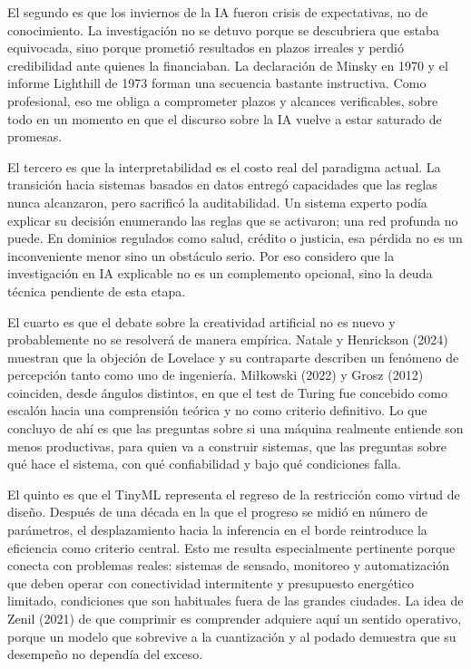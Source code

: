 \documentclass[12pt,letterpaper,oneside]{article}
\begin{document}
El segundo es que los inviernos de la IA fueron crisis de expectativas, no de conocimiento. La investigación no se detuvo porque se descubriera que estaba equivocada, sino porque prometió resultados en plazos irreales y perdió credibilidad ante quienes la financiaban. La declaración de Minsky en 1970 y el informe Lighthill de 1973 forman una secuencia bastante instructiva. Como profesional, eso me obliga a comprometer plazos y alcances verificables, sobre todo en un momento en que el discurso sobre la IA vuelve a estar saturado de promesas.

El tercero es que la interpretabilidad es el costo real del paradigma actual. La transición hacia sistemas basados en datos entregó capacidades que las reglas nunca alcanzaron, pero sacrificó la auditabilidad. Un sistema experto podía explicar su decisión enumerando las reglas que se activaron; una red profunda no puede. En dominios regulados como salud, crédito o justicia, esa pérdida no es un inconveniente menor sino un obstáculo serio. Por eso considero que la investigación en IA explicable no es un complemento opcional, sino la deuda técnica pendiente de esta etapa.

El cuarto es que el debate sobre la creatividad artificial no es nuevo y probablemente no se resolverá de manera empírica. Natale y Henrickson (2024) muestran que la objeción de Lovelace y su contraparte describen un fenómeno de percepción tanto como uno de ingeniería. Miłkowski (2022) y Grosz (2012) coinciden, desde ángulos distintos, en que el test de Turing fue concebido como escalón hacia una comprensión teórica y no como criterio definitivo. Lo que concluyo de ahí es que las preguntas sobre si una máquina realmente entiende son menos productivas, para quien va a construir sistemas, que las preguntas sobre qué hace el sistema, con qué confiabilidad y bajo qué condiciones falla.

El quinto es que el TinyML representa el regreso de la restricción como virtud de diseño. Después de una década en la que el progreso se midió en número de parámetros, el desplazamiento hacia la inferencia en el borde reintroduce la eficiencia como criterio central. Esto me resulta especialmente pertinente porque conecta con problemas reales: sistemas de sensado, monitoreo y automatización que deben operar con conectividad intermitente y presupuesto energético limitado, condiciones que son habituales fuera de las grandes ciudades. La idea de Zenil (2021) de que comprimir es comprender adquiere aquí un sentido operativo, porque un modelo que sobrevive a la cuantización y al podado demuestra que su desempeño no dependía del exceso.
\end{document}

